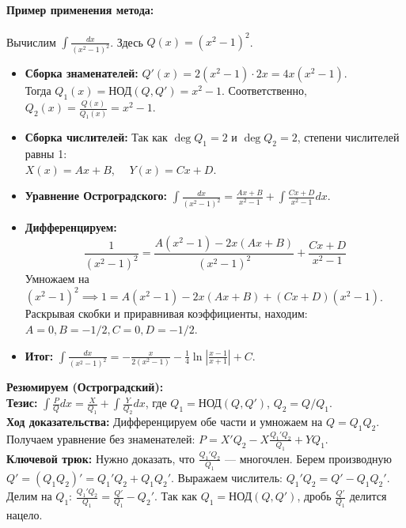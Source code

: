 \paragraph{Пример применения метода:} Вычислим $\int \frac{dx}{(x^2-1)^2}$. Здесь $Q(x) = (x^2-1)^2$.
\begin{itemize}
    \item \textbf{Сборка знаменателей:} $Q'(x) = 2(x^2-1)\cdot 2x = 4x(x^2-1)$. \\ Тогда $Q_1(x) = \text{НОД}(Q, Q') = x^2-1$. Соответственно, $Q_2(x) = \frac{Q(x)}{Q_1(x)} = x^2-1$.
    \item \textbf{Сборка числителей:} Так как $\deg Q_1 = 2$ и $\deg Q_2 = 2$, степени числителей равны 1: \\ $X(x) = Ax + B$, $\quad Y(x) = Cx + D$.
    \item \textbf{Уравнение Остроградского:} $\int \frac{dx}{(x^2-1)^2} = \frac{Ax+B}{x^2-1} + \int \frac{Cx+D}{x^2-1} dx$. 
    \item \textbf{Дифференцируем:}
    $$ \frac{1}{(x^2-1)^2} = \frac{A(x^2-1) - 2x(Ax+B)}{(x^2-1)^2} + \frac{Cx+D}{x^2-1} $$
    Умножаем на $(x^2-1)^2 \implies 1 = A(x^2-1) - 2x(Ax+B) + (Cx+D)(x^2-1)$.
    \\ Раскрывая скобки и приравнивая коэффициенты, находим: $A = 0, B = -1/2, C = 0, D = -1/2$.
    \item \textbf{Итог:} $\int \frac{dx}{(x^2-1)^2} = -\frac{x}{2(x^2-1)} - \frac{1}{4}\ln\left|\frac{x-1}{x+1}\right| + C$.
\end{itemize}

\begin{tcolorbox}[colback=gray!5, colframe=black, boxrule=0.5pt, arc=0pt]
\textbf{Резюмируем (Остроградский):} \\
\textbf{Тезис:} $\int \frac{P}{Q} dx = \frac{X}{Q_1} + \int \frac{Y}{Q_2} dx$, где $Q_1 = \text{НОД}(Q, Q')$, $Q_2 = Q/Q_1$. \\
\textbf{Ход доказательства:} Дифференцируем обе части и умножаем на $Q = Q_1 Q_2$. Получаем уравнение без знаменателей: $P = X'Q_2 - X \frac{Q_1' Q_2}{Q_1} + Y Q_1$. \\
\textbf{Ключевой трюк:} Нужно доказать, что $\frac{Q_1' Q_2}{Q_1}$ — многочлен. Берем производную $Q' = (Q_1 Q_2)' = Q_1' Q_2 + Q_1 Q_2'$. Выражаем числитель: $Q_1' Q_2 = Q' - Q_1 Q_2'$. Делим на $Q_1$: $\frac{Q_1' Q_2}{Q_1} = \frac{Q'}{Q_1} - Q_2'$. Так как $Q_1 = \text{НОД}(Q, Q')$, дробь $\frac{Q'}{Q_1}$ делится нацело.
\end{tcolorbox}

